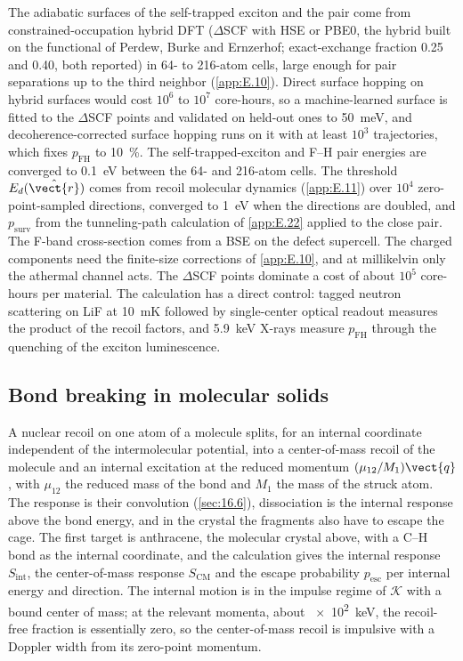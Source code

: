 The adiabatic surfaces of the self-trapped exciton and the pair come from constrained-occupation hybrid DFT ($\Delta$SCF with HSE or PBE0, the hybrid built on the functional of Perdew, Burke and Ernzerhof; exact-exchange fraction 0.25 and 0.40, both reported) in 64- to 216-atom cells, large enough for pair separations up to the third neighbor (\cref{app:E.10}). Direct surface hopping on hybrid surfaces would cost $10^6$ to $10^7$ core-hours, so a machine-learned surface is fitted to the $\Delta$SCF points and validated on held-out ones to \SI{50}{meV}, and decoherence-corrected surface hopping runs on it with at least $10^3$ trajectories, which fixes $p_{\mathrm{FH}}$ to \SI{10}{\percent}. The self-trapped-exciton and F--H pair energies are converged to \SI{0.1}{eV} between the 64- and 216-atom cells. The threshold $E_d(\hat{\vect{r}})$ comes from recoil molecular dynamics (\cref{app:E.11}) over $10^4$ zero-point-sampled directions, converged to \SI{1}{eV} when the directions are doubled, and $p_{\mathrm{surv}}$ from the tunneling-path calculation of \cref{app:E.22} applied to the close pair. The F-band cross-section comes from a BSE on the defect supercell. The charged components need the finite-size corrections of \cref{app:E.10}, and at millikelvin only the athermal channel acts. The $\Delta$SCF points dominate a cost of about $10^5$ core-hours per material. The calculation has a direct control: tagged neutron scattering on LiF at \SI{10}{mK} followed by single-center optical readout measures the product of the recoil factors, and \SI{5.9}{keV} X-rays measure $p_{\mathrm{FH}}$ through the quenching of the exciton luminescence.

\subsection{Bond breaking in molecular solids}

A nuclear recoil on one atom of a molecule splits, for an internal coordinate independent of the intermolecular potential, into a center-of-mass recoil of the molecule and an internal excitation at the reduced momentum $(\mu_{12}/M_1)\vect{q}$, with $\mu_{12}$ the reduced mass of the bond and $M_1$ the mass of the struck atom. The response is their convolution (\cref{sec:16.6}), dissociation is the internal response above the bond energy, and in the crystal the fragments also have to escape the cage. The first target is anthracene, the molecular crystal above, with a C--H bond as the internal coordinate, and the calculation gives the internal response $S_{\mathrm{int}}$, the center-of-mass response $S_{\mathrm{CM}}$ and the escape probability $p_{\mathrm{esc}}$ per internal energy and direction. The internal motion is in the impulse regime of $\mathcal{K}$ with a bound center of mass; at the relevant momenta, about \SI{e2}{keV}, the recoil-free fraction is essentially zero, so the center-of-mass recoil is impulsive with a Doppler width from its zero-point momentum.

